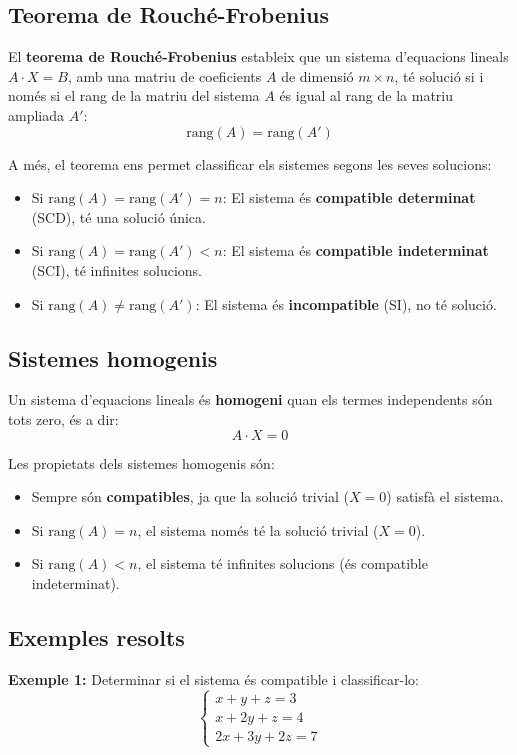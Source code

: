 \documentclass[12pt]{article}
\begin{document}
\subsection{Teorema de Rouché-Frobenius}
\begin{concept}
El \textbf{teorema de Rouché-Frobenius} estableix que un sistema d'equacions lineals \(A \cdot X = B\), amb una matriu de coeficients \(A\) de dimensió \(m \times n\), té solució si i només si el rang de la matriu del sistema \(A\) és igual al rang de la matriu ampliada \(A'\):
\[
\text{rang}(A) = \text{rang}(A')
\]

A més, el teorema ens permet classificar els sistemes segons les seves solucions:
\begin{itemize}
    \item Si \( \text{rang}(A) = \text{rang}(A') = n \): El sistema és \textbf{compatible determinat} (SCD), té una solució única.
    \item Si \( \text{rang}(A) = \text{rang}(A') < n \): El sistema és \textbf{compatible indeterminat} (SCI), té infinites solucions.
    \item Si \( \text{rang}(A) \neq \text{rang}(A') \): El sistema és \textbf{incompatible} (SI), no té solució.
\end{itemize}
\end{concept}

\subsection{Sistemes homogenis}
\begin{concept}
Un sistema d'equacions lineals és \textbf{homogeni} quan els termes independents són tots zero, és a dir:
\[
A \cdot X = 0
\]

Les propietats dels sistemes homogenis són:
\begin{itemize}
    \item Sempre són \textbf{compatibles}, ja que la solució trivial (\(X = 0\)) satisfà el sistema.
    \item Si \( \text{rang}(A) = n \), el sistema només té la solució trivial (\(X = 0\)).
    \item Si \( \text{rang}(A) < n \), el sistema té infinites solucions (és compatible indeterminat).
\end{itemize}
\end{concept}

\subsection*{Exemples resolts}
\begin{exemple}
\textbf{Exemple 1:} Determinar si el sistema és compatible i classificar-lo:
\[
\begin{cases}
x + y + z = 3 \\
x + 2y + z = 4 \\
2x + 3y + 2z = 7
\end{cases}
\]

\end{exemple}
\end{document}
